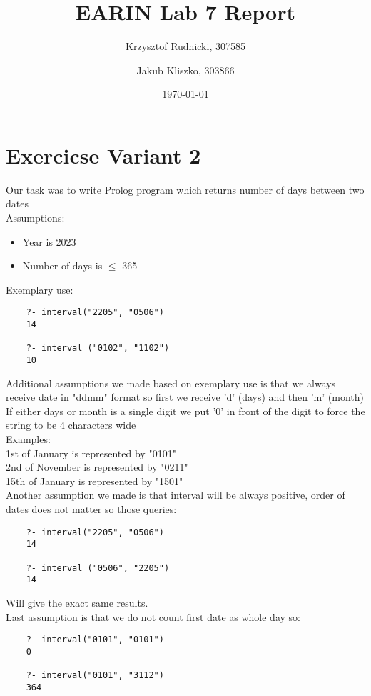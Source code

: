 \documentclass{article}[12pt]
\title{EARIN Lab 7 Report}
\author{Krzysztof Rudnicki, 307585 \and Jakub Kliszko, 303866}
\date{\today}
\begin{document}
\maketitle
\section{Exercicse Variant 2}
Our task was to write Prolog program which returns number of days between two dates \\ 
Assumptions:
\begin{itemize}
    \item Year is 2023
    \item Number of days is $\leq$ 365
\end{itemize}

Exemplary use:
\begin{lstlisting}
    ?- interval("2205", "0506")
    14

    ?- interval ("0102", "1102")
    10
\end{lstlisting}
Additional assumptions we made based on exemplary use is that we always receive date in "ddmm" format so first we receive 'd' (days) and then 'm' (month) \\ 
If either days or month is a single digit we put '0' in front of the digit to force the string to be 4 characters wide \\ 
Examples: \\
1st of January is represented by "0101" \\ 
2nd of November is represented by "0211" \\ 
15th of January is represented by "1501" \\ 
Another assumption we made is that interval will be always positive, order of dates does not matter so those queries:
\begin{lstlisting}
    ?- interval("2205", "0506")
    14

    ?- interval ("0506", "2205")
    14
\end{lstlisting}
Will give the exact same results. \\ 
Last assumption is that we do not count first date as whole day so:
\begin{lstlisting}
    ?- interval("0101", "0101")
    0

    ?- interval("0101", "3112")
    364
\end{lstlisting}
\end{document}
